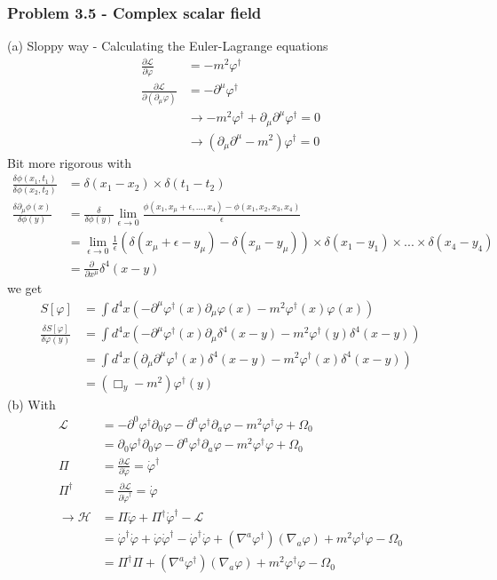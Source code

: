 \documentclass[10pt,a4paper]{article}
\theoremstyle{definition}
\begin{document}
\subsubsection{Problem 3.5 - Complex scalar field}
(a) Sloppy way - Calculating the Euler-Lagrange equations
\begin{align}
\frac{\partial\mathcal{L}}{\partial\varphi}
&=-m^2\varphi^\dagger\\
\frac{\partial\mathcal{L}}{\partial(\partial_\mu\varphi)}&=-\partial^\mu\varphi^\dagger\\
&\rightarrow -m^2\varphi^\dagger+\partial_\mu\partial^\mu\varphi^\dagger=0\\
&\rightarrow (\partial_\mu\partial^\mu-m^2)\varphi^\dagger=0
\end{align}
Bit more rigorous with
\begin{align}
\frac{\delta\phi(x_1,t_1)}{\delta\phi(x_2,t_2)}&=\delta(x_1-x_2)\times\delta(t_1-t_2)\\
\frac{\delta\partial_\mu\phi(x)}{\delta\phi(y)}&=\frac{\delta}{\delta\phi(y)}\lim_{\epsilon\rightarrow0}\frac{\phi(x_1,x_\mu+\epsilon,...,x_4)-\phi(x_1,x_2,x_3,x_4)}{\epsilon}\\
&=\lim_{\epsilon\rightarrow0}\frac{1}{\epsilon}\left(\delta(x_\mu+\epsilon-y_\mu)-\delta(x_\mu-y_\mu)\right)\times\delta(x_1-y_1)\times...\times\delta(x_4-y_4)\\
&=\frac{\partial}{\partial x^\mu}\delta^4(x-y)
\end{align}
we get
\begin{align}
S[\varphi]
&=\int d^4x\left(-\partial^\mu\varphi^\dagger(x)\partial_\mu\varphi(x)-m^2\varphi^\dagger(x)\varphi(x)\right)\\
\frac{\delta S[\varphi]}{\delta\varphi(y)}
&=\int d^4x\left(-\partial^\mu\varphi^\dagger(x)\partial_\mu\delta^4(x-y)-m^2\varphi^\dagger(y)\delta^4(x-y)\right)\\
&=\int d^4x\left(\partial_\mu\partial^\mu\varphi^\dagger(x)\delta^4(x-y)-m^2\varphi^\dagger(x)\delta^4(x-y)\right)\\
&=(\Box_y-m^2)\varphi^\dagger(y)
\end{align}
(b) With
\begin{align}
\mathcal{L}
&=-\partial^0\varphi^\dagger\partial_0\varphi-\partial^a\varphi^\dagger\partial_a\varphi-m^2\varphi^\dagger\varphi+\Omega_0\\
&=\partial_0\varphi^\dagger\partial_0\varphi-\partial^a\varphi^\dagger\partial_a\varphi-m^2\varphi^\dagger\varphi+\Omega_0\\
\Pi&=\frac{\partial\mathcal{L}}{\partial\dot\varphi}
=\dot\varphi^\dagger\\
\Pi^\dagger&=\frac{\partial\mathcal{L}}{\partial\dot\varphi^\dagger}
=\dot\varphi\\
\rightarrow\mathcal{H}&=\Pi\dot\varphi+\Pi^\dagger\dot\varphi^\dagger-\mathcal{L}\\
&=\dot\varphi^\dagger\dot\varphi+\dot\varphi\dot\varphi^\dagger-\dot\varphi^\dagger\dot\varphi+(\nabla^a\varphi^\dagger)(\nabla_a\varphi)+m^2\varphi^\dagger\varphi-\Omega_0\\
&=\Pi^\dagger\Pi+(\nabla^a\varphi^\dagger)(\nabla_a\varphi)+m^2\varphi^\dagger\varphi-\Omega_0
\end{align}
\end{document}
